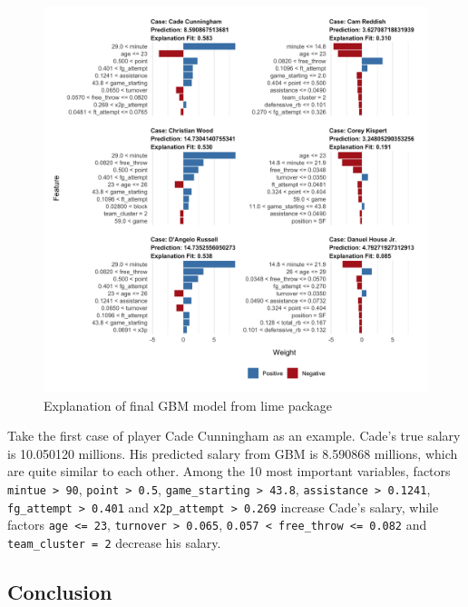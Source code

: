 \documentclass[
]{article}
\begin{document}
\begin{figure}
\centering
\includegraphics[width=\textwidth,height=0.5\textheight]{report_figures/figure_tree_4.png}
\caption{Explanation of final GBM model from lime package}
\end{figure}

Take the first case of player Cade Cunningham as an example. Cade's true
salary is 10.050120 millions. His predicted salary from GBM is 8.590868
millions, which are quite similar to each other. Among the 10 most
important variables, factors \texttt{mintue\ \textgreater{}\ 90},
\texttt{point\ \textgreater{}\ 0.5},
\texttt{game\_starting\ \textgreater{}\ 43.8},
\texttt{assistance\ \textgreater{}\ 0.1241},
\texttt{fg\_attempt\ \textgreater{}\ 0.401} and
\texttt{x2p\_attempt\ \textgreater{}\ 0.269} increase Cade's salary,
while factors \texttt{age\ \textless{}=\ 23},
\texttt{turnover\ \textgreater{}\ 0.065},
\texttt{0.057\ \textless{}\ free\_throw\ \textless{}=\ 0.082} and
\texttt{team\_cluster\ =\ 2} decrease his salary.

\hypertarget{conclusion}{%
\subsection{Conclusion}\label{conclusion}}
\end{document}

